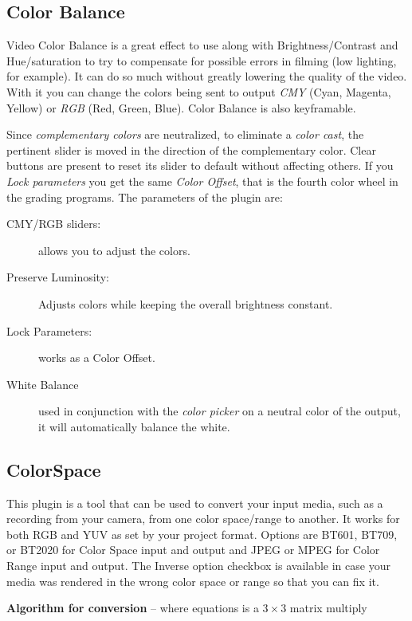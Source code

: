\subsection{Color Balance}%
\label{sub:color_balance}

Video Color Balance is a great effect to use along with Brightness/Contrast and Hue/saturation to try to compensate for possible errors in filming (low lighting, for example). It can do so much without greatly lowering the quality of the video. With it you can change the colors being sent to output \textit{CMY} (Cyan, Magenta, Yellow) or \textit{RGB} (Red, Green, Blue). Color Balance is also keyframable.

Since \textit{complementary colors} are neutralized, to eliminate a \textit{color cast}, the pertinent slider is moved in the direction of the complementary color. Clear buttons are present to reset its slider to default without affecting others. If you \textit{Lock parameters} you get the same \textit{Color Offset}, that is the fourth color wheel in the grading programs. The parameters of the plugin are:

\begin{description}
    \item[CMY/RGB sliders:] allows you to adjust the colors.
    \item[Preserve Luminosity:] Adjusts colors while keeping the overall brightness constant.
    \item[Lock Parameters:] works as a Color Offset.
    \item[White Balance] used in conjunction with the \textit{color picker} on a neutral color of the output, it will automatically balance the white.
\end{description}

\subsection{ColorSpace}%
\label{sub:color_space}

This plugin is a tool that can be used to convert your input media, such as a recording from your camera,
from one color space/range to another.  It works for both RGB and YUV as set by your project format.
Options are BT601, BT709, or BT2020 for Color Space input and output and JPEG or MPEG for Color Range
input and output.  The Inverse option checkbox is available in case your media was rendered in the wrong
color space  or range so that you can fix it.

\textbf{Algorithm for conversion} -- where equations is a $3\times3$ matrix multiply

